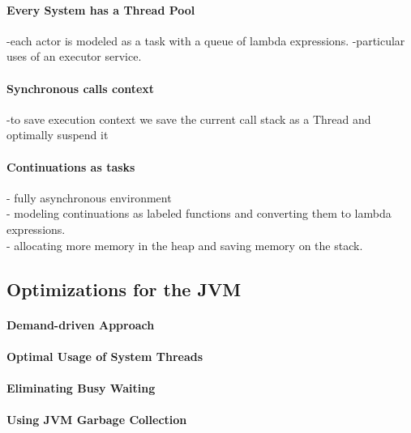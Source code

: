 \paragraph{Every System has a Thread Pool}
-each actor is modeled as a task with a queue of lambda expressions.
-particular uses of an executor service.

\paragraph{Synchronous calls context}
-to save execution context we save the current call stack as a Thread and optimally suspend it

\paragraph{Continuations as tasks}
- fully asynchronous environment\\
- modeling continuations as labeled functions and converting them to lambda expressions.\\
- allocating more memory in the heap and saving memory on the stack.\\

\subsection{Optimizations for the JVM}

\paragraph{Demand-driven Approach}

\paragraph{Optimal Usage of System Threads}

\paragraph{Eliminating Busy Waiting}

\paragraph{Using JVM Garbage Collection}
